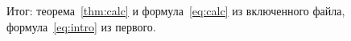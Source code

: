 \documentclass[12pt]{article}
\numberwithin{equation}{section}
\begin{document}



Итог: теорема~\ref{thm:calc} и формула~\eqref{eq:calc} из включенного файла,
формула~\eqref{eq:intro} из первого.
\end{document}
